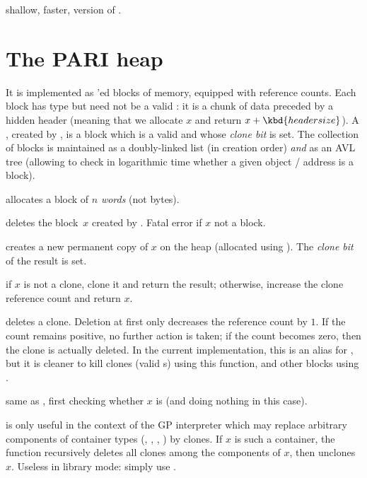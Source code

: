  shallow, faster, version of .

\section{The PARI heap}

It is implemented as 'ed blocks of memory, equipped with
reference counts. Each block has type  but need not be a valid
: it is a chunk of data preceded by a hidden header (meaning that we
allocate $x$ and return $x + \kbd{header size}$). A , created by
, is a block which is a valid  and whose \emph{clone
bit} is set. The collection of blocks is maintained as a doubly-linked list
(in creation order) \emph{and} as an AVL tree (allowing to check in
logarithmic time whether a given object / address is a block).


 allocates a block of $n$ \emph{words} (not bytes).

 deletes the block~$x$ created by .
Fatal error if $x$ not a block.

 creates a new permanent copy of $x$ on the heap
(allocated using ). The \emph{clone bit} of the result is set.

 if $x$ is not a clone, clone it and return the
result; otherwise, increase the clone reference count and return $x$.

 deletes a clone. Deletion at first only decreases
the reference count by $1$. If the count remains positive, no further action is
taken; if the count becomes zero, then the clone is actually deleted. In the
current implementation, this is an alias for , but it is cleaner
to kill clones (valid s) using this function, and other blocks using
.

 same as , first checking
whether $x$ is  (and doing nothing in this case).

 is only useful in the context of the GP
interpreter which may replace arbitrary components of container types
(, , , ) by clones. If $x$ is such
a container, the function recursively deletes all clones among the components
of $x$, then unclones $x$. Useless in library mode: simply use
.

